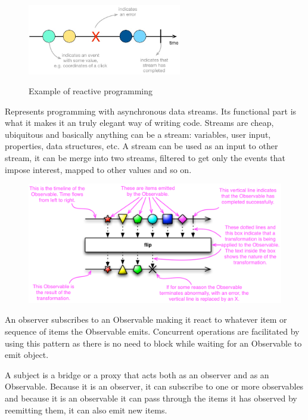 \documentclass[12 pct]{report}
\begin{document}
\begin{figure}[H]
\includegraphics[width=0.6\textwidth]{streams}
\centering
\label{fig:reactive-pgrogramming}
\caption{Example of reactive programming }
\end{figure}

Represents programming with asynchronous data streams. Its functional part is what it makes it an truly elegant way of writing code. Streams are cheap, ubiquitous and basically anything can be a stream: variables, user input, properties, data structures, etc. A stream can be used as an input to other stream, it can be merge into two streams, filtered to get only the events that impose interest, mapped to other  values and so on.

\begin{figure}[H]
\includegraphics[width=1.0\textwidth]{observable-doc}
\centering
\label{fig:feature-points}
\caption{ \cite{reactivexDocumentation} }
\end{figure}


An observer subscribes to an Observable making it react to whatever item or sequence of items the Observable emits. Concurrent operations are facilitated by using this pattern as there is no need to block while waiting for an Observable to emit object.

A subject is a bridge or a proxy that acts both as an observer and as an Observable. Because it is an observer, it can subscribe to one or more observables and because it is an observable it can pass through the items it has observed by reemitting them, it can also emit new items.
\end{document}
